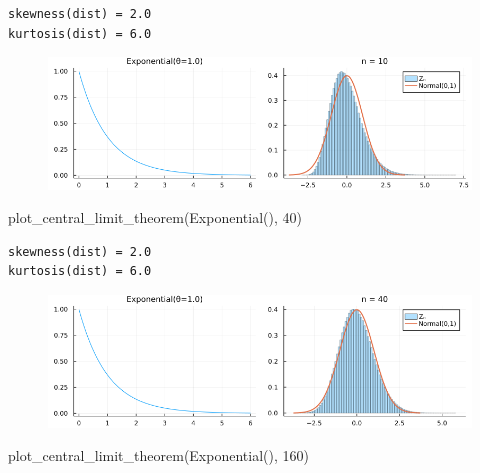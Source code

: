 \documentclass[
  letterpaper,
  DIV=11,
  numbers=noendperiod]{scrartcl}
\newenvironment{Shaded}{\begin{snugshade}}{\end{snugshade}}
\newcommand{\FloatTok}[1]{\textcolor[rgb]{0.68,0.00,0.00}{#1}}
\newcommand{\FunctionTok}[1]{\textcolor[rgb]{0.28,0.35,0.67}{#1}}
\newcommand{\NormalTok}[1]{\textcolor[rgb]{0.00,0.23,0.31}{#1}}
\begin{document}
\begin{verbatim}
skewness(dist) = 2.0
kurtosis(dist) = 6.0
\end{verbatim}

\begin{figure}[H]

{\centering \includegraphics{05 Central limit theorem_files/figure-pdf/cell-81-output-2.png}

}

\end{figure}

\begin{Shaded}
\begin{Highlighting}[]
\FunctionTok{plot\_central\_limit\_theorem}\NormalTok{(}\FunctionTok{Exponential}\NormalTok{(), }\FloatTok{40}\NormalTok{)}
\end{Highlighting}
\end{Shaded}

\begin{verbatim}
skewness(dist) = 2.0
kurtosis(dist) = 6.0
\end{verbatim}

\begin{figure}[H]

{\centering \includegraphics{05 Central limit theorem_files/figure-pdf/cell-82-output-2.png}

}

\end{figure}

\begin{Shaded}
\begin{Highlighting}[]
\FunctionTok{plot\_central\_limit\_theorem}\NormalTok{(}\FunctionTok{Exponential}\NormalTok{(), }\FloatTok{160}\NormalTok{)}
\end{Highlighting}
\end{Shaded}
\end{document}
